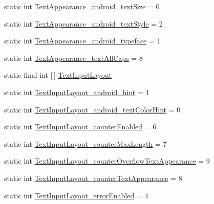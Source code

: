 \begin{DoxyCompactItemize}
static int \hyperlink{classandroid_1_1support_1_1v7_1_1mediarouter_1_1R_1_1styleable_a9988f4dbc2f3276bd7a8362c792b2fff}{Text\+Appearance\+\_\+android\+\_\+text\+Size} = 0
\item 
static int \hyperlink{classandroid_1_1support_1_1v7_1_1mediarouter_1_1R_1_1styleable_a2af45fccc46df62e5eebf47ba223c488}{Text\+Appearance\+\_\+android\+\_\+text\+Style} = 2
\item 
static int \hyperlink{classandroid_1_1support_1_1v7_1_1mediarouter_1_1R_1_1styleable_a39493f01673ec164f3f21508901be8ef}{Text\+Appearance\+\_\+android\+\_\+typeface} = 1
\item 
static int \hyperlink{classandroid_1_1support_1_1v7_1_1mediarouter_1_1R_1_1styleable_ab8377ae9b2955b9b7e3a0ac98b305840}{Text\+Appearance\+\_\+text\+All\+Caps} = 8
\item 
static final int \mbox{[}$\,$\mbox{]} \hyperlink{classandroid_1_1support_1_1v7_1_1mediarouter_1_1R_1_1styleable_a935a5feb3f0394eb1c07f26b207dfb2d}{Text\+Input\+Layout}
\item 
static int \hyperlink{classandroid_1_1support_1_1v7_1_1mediarouter_1_1R_1_1styleable_a9a349e2d2e549ba75b3cd7d7843904c6}{Text\+Input\+Layout\+\_\+android\+\_\+hint} = 1
\item 
static int \hyperlink{classandroid_1_1support_1_1v7_1_1mediarouter_1_1R_1_1styleable_a4b215970513b838b98f7dd32725bd67b}{Text\+Input\+Layout\+\_\+android\+\_\+text\+Color\+Hint} = 0
\item 
static int \hyperlink{classandroid_1_1support_1_1v7_1_1mediarouter_1_1R_1_1styleable_a53328a693db3d3cdbec7e92369b8e2e8}{Text\+Input\+Layout\+\_\+counter\+Enabled} = 6
\item 
static int \hyperlink{classandroid_1_1support_1_1v7_1_1mediarouter_1_1R_1_1styleable_a930a315bdfd694267732a06661f7e664}{Text\+Input\+Layout\+\_\+counter\+Max\+Length} = 7
\item 
static int \hyperlink{classandroid_1_1support_1_1v7_1_1mediarouter_1_1R_1_1styleable_a6b4f04d61761f9eee7e2fd1a97c8503f}{Text\+Input\+Layout\+\_\+counter\+Overflow\+Text\+Appearance} = 9
\item 
static int \hyperlink{classandroid_1_1support_1_1v7_1_1mediarouter_1_1R_1_1styleable_ae9e5833b8f6e6eecad4561363b0a89cb}{Text\+Input\+Layout\+\_\+counter\+Text\+Appearance} = 8
\item 
static int \hyperlink{classandroid_1_1support_1_1v7_1_1mediarouter_1_1R_1_1styleable_a3bb087258c99f0fc35c00751b6ce5741}{Text\+Input\+Layout\+\_\+error\+Enabled} = 4
\item 

\end{DoxyCompactItemize}
